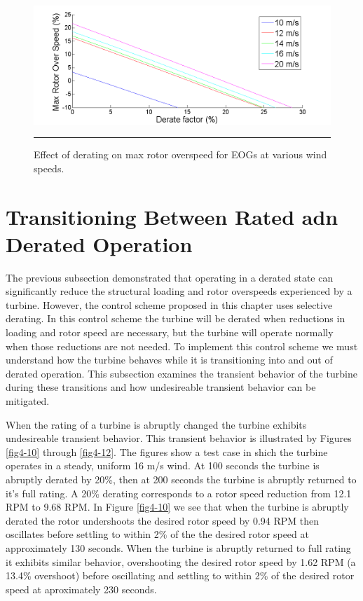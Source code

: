 \begin{figure}[htbp]
	\centering
		\includegraphics[trim = {1cm 0 2cm 0}, clip, width = \linewidth]{Figures/ch4Figures/fig4-9.png}
		\rule{35em}{0.5pt}
	\caption{Effect of derating on max rotor overspeed for EOGs at various wind speeds.}
	\label{fig4-9}
\end{figure}



\section{Transitioning Between Rated adn Derated Operation} \label{section4-4}


The previous subsection demonstrated that operating in a derated state can significantly reduce the structural loading and rotor overspeeds experienced by a turbine. However, the control scheme proposed in this chapter uses selective derating. In this control scheme the turbine will be derated when reductions in loading and rotor speed are necessary, but the turbine will operate normally when those reductions are not needed. To implement this control scheme we must understand how the turbine behaves while it is transitioning into and out of derated operation. This subsection examines the transient behavior of the turbine during these transitions and how undesireable transient behavior can be mitigated.

 When the rating of a turbine is abruptly changed the turbine exhibits undesireable transient behavior. This transient behavior is illustrated by Figures \ref{fig4-10} through \ref{fig4-12}. The figures show a test case in shich the turbine operates in a steady, uniform 16 m/s wind. At 100 seconds the turbine is abruptly derated by 20\%, then at 200 seconds the turbine is abruptly returned to it's full rating. A 20\% derating corresponds to a rotor speed reduction from 12.1 RPM to 9.68 RPM. In Figure \ref{fig4-10} we see that when the turbine is abruptly derated the rotor undershoots the desired rotor speed by 0.94 RPM then oscillates before settling to within 2\% of the the desired rotor speed at approximately 130 seconds. When the turbine is abruptly returned to full rating it exhibits similar behavior, overshooting the desired rotor speed by 1.62 RPM (a 13.4\% overshoot) before oscillating and settling to within 2\% of the desired rotor speed at aproximately 230 seconds. 

